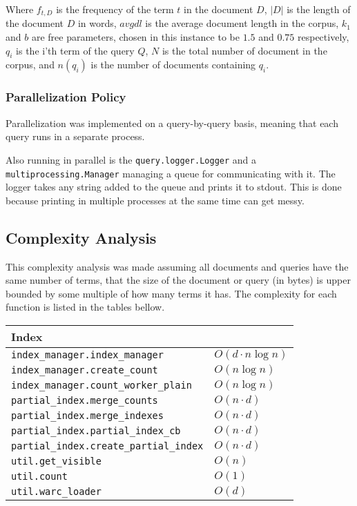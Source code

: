 \documentclass[sigconf,authorversion,nonacm]{acmart}
\def\code#1{\texttt{#1}}
\begin{document}
Where $f_{t,D}$ is the frequency of the term $t$ in the document $D$, $|D|$ is the length of the document $D$ in words, $avgdl$ is the average document length in the corpus, $k_1$ and $b$ are free parameters, chosen in this instance to be $1.5$ and $0.75$ respectively, $q_i$ is the i'th term of the query $Q$, $N$ is the total number of document in the corpus, and $n(q_i)$ is the number of documents containing $q_i$.

\subsubsection{Parallelization Policy}

Parallelization was implemented on a query-by-query basis, meaning that each query runs in a separate process.

Also running in parallel is the \code{query.logger.Logger} and a \code{multiprocessing.Manager} managing a queue for communicating with it. The logger takes any string added to the queue and prints it to stdout. This is done because printing in multiple processes at the same time can get messy.

\subsection{Complexity Analysis}

This complexity analysis was made assuming all documents and queries have the same number of terms, that the size of the document or query (in bytes) is upper bounded by some multiple of how many terms it has. The complexity for each function is listed in the tables bellow.

\medskip


\begin{tabular}{ll}
  Index                                            &                      \\
  \toprule
  \code{index\_manager.index\_manager}             & $O(d \cdot n\log n)$ \\
  \code{index\_manager.create\_count}              & $O(n\log n)$         \\
  \code{index\_manager.count\_worker\_plain}       & $O(n\log n)$         \\
  \code{partial\_index.merge\_counts}              & $O(n\cdot d)$        \\
  \code{partial\_index.merge\_indexes}             & $O(n\cdot d)$        \\
  \code{partial\_index.partial\_index\_cb} & $O(n\cdot d)$        \\
  \code{partial\_index.create\_partial\_index}     & $O(n\cdot d)$        \\
  \code{util.get\_visible}                         & $O(n)$               \\
  \code{util.count}                                & $O(1)$               \\
  \code{util.warc\_loader}                         & $O(d)$               \\
  \bottomrule
\end{tabular}
\end{document}
